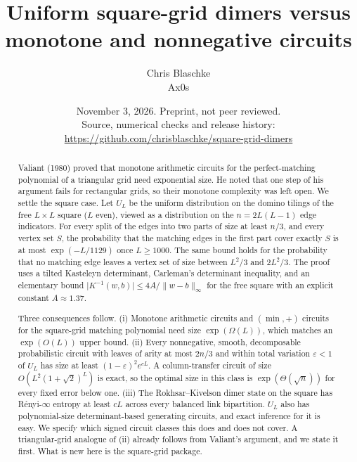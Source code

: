 \documentclass[11pt]{article}
\title{Uniform square-grid dimers versus monotone and nonnegative circuits}
\author{Chris Blaschke\\Ax0s}
\date{November 3, 2026. Preprint, not peer reviewed.\\ \small Source, numerical checks and release history: \url{https://github.com/chrisblaschke/square-grid-dimers}}
\theoremstyle{definition}
\theoremstyle{remark}
\theoremstyle{plain}
\newcommand{\eps}{\varepsilon}
\newcommand{\norm}[1]{\lVert #1\rVert}
\newcommand{\abs}[1]{\lvert #1\rvert}
\begin{document}
\maketitle

\begin{abstract}
Valiant (1980) proved that monotone arithmetic circuits for the perfect-matching polynomial of a triangular grid need exponential size. He noted that one step of his argument fails for rectangular grids, so their monotone complexity was left open. We settle the square case. Let $U_L$ be the uniform distribution on the domino tilings of the free $L\times L$ square ($L$ even), viewed as a distribution on the $n=2L(L-1)$ edge indicators. For every split of the edges into two parts of size at least $n/3$, and every vertex set $S$, the probability that the matching edges in the first part cover exactly $S$ is at most $\exp(-L/1129)$ once $L\ge 1000$. The same bound holds for the probability that no matching edge leaves a vertex set of size between $L^2/3$ and $2L^2/3$. The proof uses a tilted Kasteleyn determinant, Carleman's determinant inequality, and an elementary bound $\abs{K^{-1}(w,b)}\le 4A/\norm{w-b}_\infty$ for the free square with an explicit constant $A\approx1.37$.

Three consequences follow. (i) Monotone arithmetic circuits and $(\min,+)$ circuits for the square-grid matching polynomial need size $\exp(\Omega(L))$, which matches an $\exp(O(L))$ upper bound. (ii) Every nonnegative, smooth, decomposable probabilistic circuit with leaves of arity at most $2n/3$ and within total variation $\eps<1$ of $U_L$ has size at least $(1-\eps)^2e^{cL}$. A column-transfer circuit of size $O(L^2(1+\sqrt2)^L)$ is exact, so the optimal size in this class is $\exp(\Theta(\sqrt n))$ for every fixed error below one. (iii) The Rokhsar--Kivelson dimer state on the square has R\'enyi-$\infty$ entropy at least $cL$ across every balanced link bipartition. $U_L$ also has polynomial-size determinant-based generating circuits, and exact inference for it is easy. We specify which signed circuit classes this does and does not cover. A triangular-grid analogue of (ii) already follows from Valiant's argument, and we state it first. What is new here is the square-grid package.
\end{abstract}

\tableofcontents













\appendix




\end{document}
